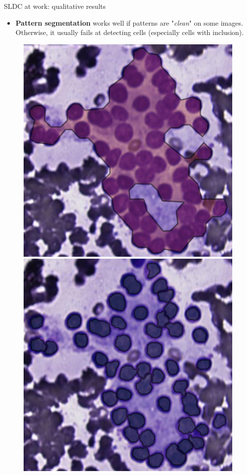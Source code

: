 \documentclass{beamer}
\begin{document}
\begin{frame}{SLDC at work: qualitative results}
	\begin{itemize}
		\item \textbf{Pattern segmentation} works well if patterns are "\textit{clean}" on some images. Otherwise, it usually fails at detecting cells (especially cells with inclusion).
	\end{itemize}
	
	\begin{figure}
		\includegraphics[scale=0.25]{images/success_reseg_2_pat.png}
		\hspace{0.25cm}
		\includegraphics[scale=0.25]{images/success_reseg_2_nopat.png} \\

\end{figure}
\end{frame}
\end{document}

